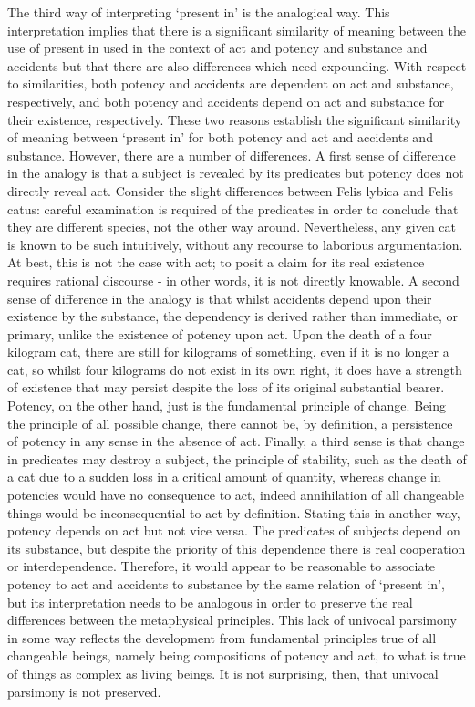 The third way of interpreting `present in' is the analogical way. This interpretation implies that there is a significant similarity of meaning between the use of present in used in the context of act and potency and substance and accidents but that there are also differences which need expounding. With respect to similarities, both potency and accidents are dependent on act and substance, respectively, and both potency and accidents depend on act and substance for their existence, respectively. These two reasons establish the significant similarity of meaning between `present in' for both potency and act and accidents and substance. However, there are a number of differences. A first sense of difference in the analogy is that a subject is revealed by its predicates but potency does not directly reveal act. Consider the slight differences between Felis lybica and Felis catus: careful examination is required of the predicates in order to conclude that they are different species, not the other way around. Nevertheless, any given cat is known to be such intuitively, without any recourse to laborious argumentation. At best, this is not the case with act; to posit a claim for its real existence requires rational discourse - in other words, it is not directly knowable. A second sense of difference in the analogy is that whilst accidents depend upon their existence by the substance, the dependency is derived rather than immediate, or primary, unlike the existence of potency upon act. Upon the death of a four kilogram cat, there are still for kilograms of something, even if it is no longer a cat, so whilst four kilograms do not exist in its own right, it does have a strength of existence that may persist despite the loss of its original substantial bearer. Potency, on the other hand, just is the fundamental principle of change. Being the principle of all possible change, there cannot be, by definition, a persistence of potency in any sense in the absence of act. Finally, a third sense is that change in predicates may destroy a subject, the principle of stability, such as the death of a cat due to a sudden loss in a critical amount of quantity, whereas change in potencies would have no consequence to act, indeed annihilation of all changeable things would be inconsequential to act by definition. Stating this in another way, potency depends on act but not vice versa. The predicates of subjects depend on its substance, but despite the priority of this dependence there is real cooperation or interdependence. Therefore, it would appear to be reasonable to associate potency to act and accidents to substance by the same relation of `present in', but its interpretation needs to be analogous in order to preserve the real differences between the metaphysical principles. This lack of univocal parsimony in some way reflects the development from fundamental principles true of all changeable beings, namely being compositions of potency and act, to what is true of things as complex as living beings. It is not surprising, then, that univocal parsimony is not preserved.


